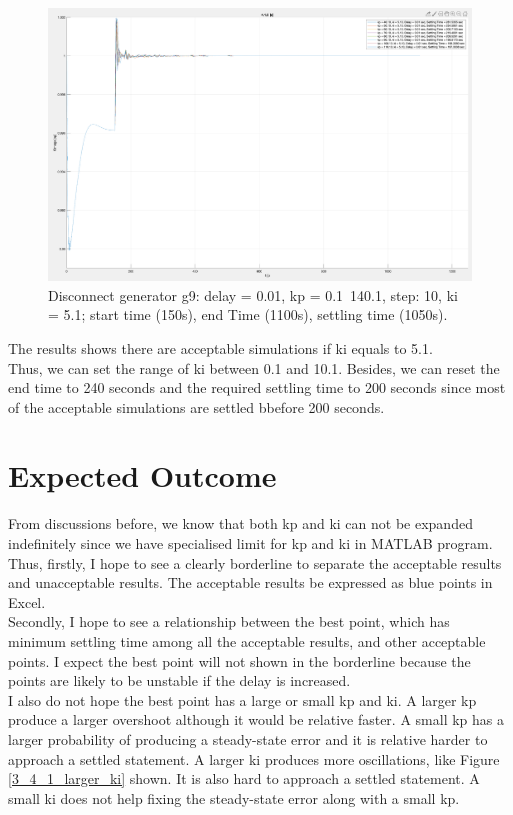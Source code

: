 \documentclass{report}
\begin{document}
\begin{figure}[htbp]
\centering
\includegraphics[width = .819\textwidth]{figure/4_1_2_c.png}
\caption{Disconnect generator g9: delay = 0.01, kp = 0.1~140.1, step: 10, ki = 5.1; start time (150s), end Time (1100s), settling time (1050s).}
\label{4_1_2_c}
\end{figure}

The results shows there are acceptable simulations if ki equals to 5.1. \\

Thus, we can set the range of ki between 0.1 and 10.1. 
Besides, we can reset the end time to 240 seconds and the required settling time to 200 seconds since most of the acceptable simulations are settled bbefore 200 seconds.\\

\section{Expected Outcome} %
\label{section4.2}
From discussions before, we know that both kp and ki can not be expanded indefinitely since we have specialised limit for kp and ki in MATLAB program. Thus, firstly, I hope to see a clearly borderline to separate the acceptable results and unacceptable results. The acceptable results be expressed as blue points in Excel. \\

Secondly, I hope to see a relationship between the best point, which has minimum settling time among all the acceptable results, and other acceptable points. I expect the best point will not shown in the borderline because the points are likely to be unstable if the delay is increased. \\

I also do not hope the best point has a large or small kp and ki. A larger kp produce a larger overshoot although it would be relative faster. A small kp has a larger probability of producing a steady-state error and it is relative harder to approach a settled statement. A larger ki produces more oscillations, like Figure \textcolor{red}{\ref{3_4_1_larger_ki}} shown. It is also hard to approach a settled statement. A small ki does not help fixing the steady-state error along with a small kp. \\
\end{document}
